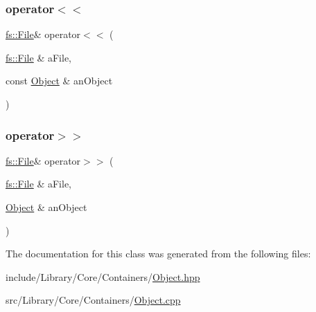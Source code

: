 \subsubsection{\texorpdfstring{operator$<$$<$}{operator<<}\hspace{0.1cm}{\footnotesize\ttfamily [2/2]}}
{\footnotesize\ttfamily \hyperlink{classlibrary_1_1core_1_1fs_1_1_file}{fs\+::\+File}\& operator$<$$<$ (\begin{DoxyParamCaption}\item[{\hyperlink{classlibrary_1_1core_1_1fs_1_1_file}{fs\+::\+File} \&}]{a\+File,  }\item[{const \hyperlink{classlibrary_1_1core_1_1ctnr_1_1_object}{Object} \&}]{an\+Object }\end{DoxyParamCaption})\hspace{0.3cm}{\ttfamily [friend]}}

\mbox{\label{classlibrary_1_1core_1_1ctnr_1_1_object_ad91e1957f0afd5d49dde0b81d11a66e1}} 
\subsubsection{\texorpdfstring{operator$>$$>$}{operator>>}}
{\footnotesize\ttfamily \hyperlink{classlibrary_1_1core_1_1fs_1_1_file}{fs\+::\+File}\& operator$>$$>$ (\begin{DoxyParamCaption}\item[{\hyperlink{classlibrary_1_1core_1_1fs_1_1_file}{fs\+::\+File} \&}]{a\+File,  }\item[{\hyperlink{classlibrary_1_1core_1_1ctnr_1_1_object}{Object} \&}]{an\+Object }\end{DoxyParamCaption})\hspace{0.3cm}{\ttfamily [friend]}}



The documentation for this class was generated from the following files\+:\begin{DoxyCompactItemize}
\item 
include/\+Library/\+Core/\+Containers/\hyperlink{_object_8hpp}{Object.\+hpp}\item 
src/\+Library/\+Core/\+Containers/\hyperlink{_object_8cpp}{Object.\+cpp}\end{DoxyCompactItemize}
